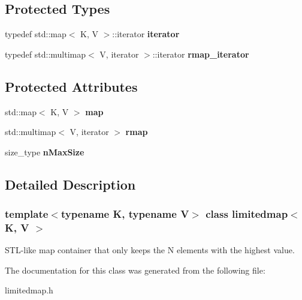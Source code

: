 \subsection*{Protected Types}
\begin{DoxyCompactItemize}
\item 
\mbox{\label{classlimitedmap_aea661213ab6f699e9667bea25bf99821}} 
typedef std\+::map$<$ K, V $>$\+::iterator {\bfseries iterator}
\item 
\mbox{\label{classlimitedmap_ad3d926b1f365d819073ddaed8daa4400}} 
typedef std\+::multimap$<$ V, iterator $>$\+::iterator {\bfseries rmap\+\_\+iterator}
\end{DoxyCompactItemize}
\subsection*{Protected Attributes}
\begin{DoxyCompactItemize}
\item 
\mbox{\label{classlimitedmap_a66e668a5286b7b82061c6867548897a0}} 
std\+::map$<$ K, V $>$ {\bfseries map}
\item 
\mbox{\label{classlimitedmap_ab4a6f5b1572ee3754d53f7773b381eb2}} 
std\+::multimap$<$ V, iterator $>$ {\bfseries rmap}
\item 
\mbox{\label{classlimitedmap_a3ff20a34a489085042060796d44a644e}} 
size\+\_\+type {\bfseries n\+Max\+Size}
\end{DoxyCompactItemize}


\subsection{Detailed Description}
\subsubsection*{template$<$typename K, typename V$>$\newline
class limitedmap$<$ K, V $>$}

S\+T\+L-\/like map container that only keeps the N elements with the highest value. 

The documentation for this class was generated from the following file\+:\begin{DoxyCompactItemize}
\item 
limitedmap.\+h\end{DoxyCompactItemize}
